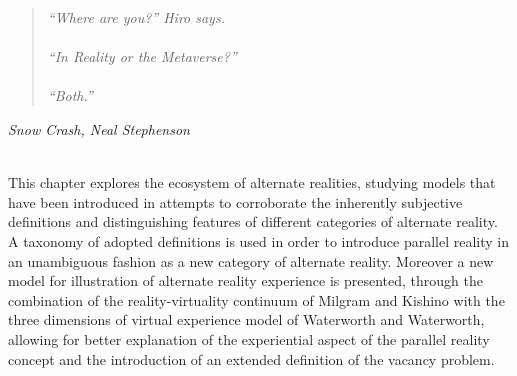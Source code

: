 \begin{quote}
\textit{``Where are you?'' Hiro says.
\\
\\
``In Reality or the Metaverse?''
\\
\\
``Both.''}
\end{quote}
\hfill \textit{Snow Crash, Neal Stephenson}
\\
\\


\label{chapter-background}



This chapter explores the ecosystem of alternate realities, studying models that have been introduced in attempts to corroborate the inherently subjective definitions and distinguishing features of different categories of alternate reality. A taxonomy of adopted definitions is used in order to introduce parallel reality in an unambiguous fashion as a new category of alternate reality. Moreover a new model for illustration of alternate reality experience is presented, through the combination of the reality-virtuality continuum of Milgram and Kishino with the three dimensions of virtual experience model of Waterworth and Waterworth, allowing for better explanation of the experiential aspect of the parallel reality concept and the introduction of an extended definition of the vacancy problem.











